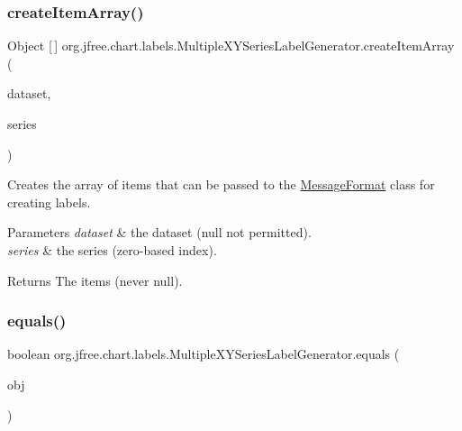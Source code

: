 \subsubsection{\texorpdfstring{create\+Item\+Array()}{createItemArray()}}
{\footnotesize\ttfamily Object \mbox{[}$\,$\mbox{]} org.\+jfree.\+chart.\+labels.\+Multiple\+X\+Y\+Series\+Label\+Generator.\+create\+Item\+Array (\begin{DoxyParamCaption}\item[{\mbox{\hyperlink{interfaceorg_1_1jfree_1_1data_1_1xy_1_1_x_y_dataset}{X\+Y\+Dataset}}}]{dataset,  }\item[{int}]{series }\end{DoxyParamCaption})\hspace{0.3cm}{\ttfamily [protected]}}

Creates the array of items that can be passed to the \mbox{\hyperlink{}{Message\+Format}} class for creating labels.


\begin{DoxyParams}{Parameters}
{\em dataset} & the dataset ({\ttfamily null} not permitted). \\
\hline
{\em series} & the series (zero-\/based index).\\
\hline
\end{DoxyParams}
\begin{DoxyReturn}{Returns}
The items (never {\ttfamily null}). 
\end{DoxyReturn}
\mbox{\label{classorg_1_1jfree_1_1chart_1_1labels_1_1_multiple_x_y_series_label_generator_a3ca7a9d244ac4c428ba5b904267a0cff}} 
\subsubsection{\texorpdfstring{equals()}{equals()}}
{\footnotesize\ttfamily boolean org.\+jfree.\+chart.\+labels.\+Multiple\+X\+Y\+Series\+Label\+Generator.\+equals (\begin{DoxyParamCaption}\item[{Object}]{obj }\end{DoxyParamCaption})}

